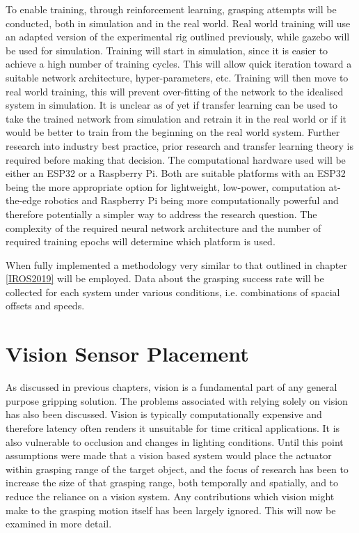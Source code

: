 To enable training, through reinforcement learning, grasping attempts will be conducted, both in simulation and in the real world. Real world training will use an adapted version of the experimental rig outlined previously, while gazebo will be used for simulation. Training will start in simulation, since it is easier to achieve a high number of training cycles. This will allow quick iteration toward a suitable network architecture, hyper-parameters, etc. Training will then move to real world training, this will prevent over-fitting of the network to the idealised system in simulation. It is unclear as of yet if transfer learning can be used to take the trained network from simulation and retrain it in the real world or if it would be better to train from the beginning on the real world system. Further research into industry best practice, prior research and transfer learning theory is required before making that decision. The computational hardware used will be either an ESP32 or a Raspberry Pi. Both are suitable platforms with an ESP32 being the more appropriate option for lightweight, low-power, computation at-the-edge robotics and Raspberry Pi being more computationally powerful and therefore potentially a simpler way to address the research question. The complexity of the required neural network architecture and the number of required training epochs will determine which platform is used.

When fully implemented a methodology very similar to that outlined in chapter \ref{IROS2019} will be employed. Data about the grasping success rate will be collected for each system under various conditions, i.e. combinations of spacial offsets and speeds. 

\section{Vision Sensor Placement}\label{Vision}

As discussed in previous chapters, vision is a fundamental part of any general purpose gripping solution. The problems associated with relying solely on vision has also been discussed. Vision is typically computationally expensive and therefore latency often renders it unsuitable for time critical applications. It is also vulnerable to occlusion and changes in lighting conditions. Until this point assumptions were made that a vision based system would place the actuator within grasping range of the target object, and the focus of research has been to increase the size of that grasping range, both temporally and spatially, and to reduce the reliance on a vision system. Any contributions which vision might make to the grasping motion itself has been largely ignored. This will now be examined in more detail.

